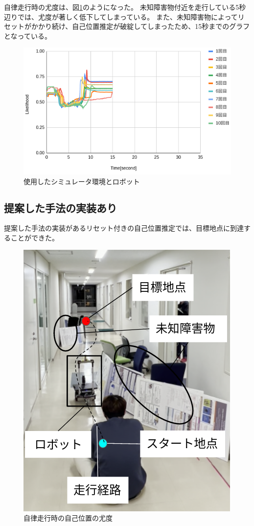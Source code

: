 自律走行時の尤度は、図\ref{fig:nav_likelihood_no_imp_real}のようになった。
未知障害物付近を走行している5秒辺りでは、尤度が著しく低下してしまっている。
また、未知障害物によってリセットがかかり続け、自己位置推定が破綻してしまったため、15秒までのグラフとなっている。

\begin{figure}[H]
  \begin{center}
    \includegraphics[width=0.98\linewidth]{figs/real_likelihood_before.png}
    \caption{使用したシミュレータ環境とロボット}
    \label{fig:nav_likelihood_no_imp_real}
  \end{center}
\end{figure}

\subsection{提案した手法の実装あり}

提案した手法の実装があるリセット付きの自己位置推定では、目標地点に到達することができた。

\begin{figure}[H]
  \begin{center}
    \includegraphics[width=0.5\linewidth]{figs/real_environment.png}
    \caption{自律走行時の自己位置の尤度}
    \label{fig:nav_imp_real}
  \end{center}
\end{figure}

